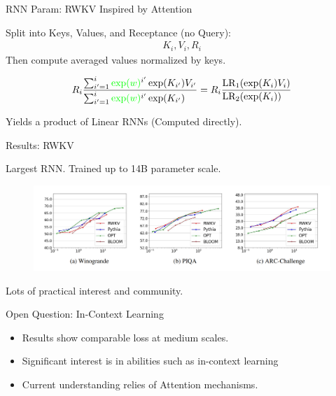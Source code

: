 \begin{frame}{RNN Param: RWKV \cite{Peng2023-yp}}
    Inspired by Attention 
    
    Split into Keys, Values, and Receptance (no Query):
    \begin{align*}
    K_i, V_i, R_i
    \end{align*}
    \pause 
    Then compute averaged values normalized by keys. 
    
    \begin{align*}
     R_i\frac{\sum_{i'=1}^i \textcolor{green}{\exp(w)}^{i'}\exp(K_{i'}) V_{i'}} {\sum_{i'=1}^i \textcolor{green}{\exp(w)}^{i'}\exp(K_{i'})\phantom{ V_{i'}}} = R_i \frac{\text{LR}_1(\exp(K_i)V_i)}{\text{LR}_2(\exp(K_i))\phantom{V_i}}\\
    \end{align*}

    Yields a product of Linear RNNs (Computed directly).
    
\end{frame}


\begin{frame}{Results: RWKV \cite{Peng2023-yp}}
    \begin{center}
        Largest RNN. Trained up to 14B parameter scale.
    \end{center}
    \pause 
    \begin{figure}
        \centering
        \includegraphics[width=1\textwidth]{Figs/RWKV.png}
        \label{fig:my_label}
    \end{figure}
    Lots of practical interest and community.
\end{frame}


\begin{frame}{Open Question: In-Context Learning}
    \begin{itemize}
        \item Results show comparable loss at medium scales.
        \item Significant interest is in abilities such as in-context learning
        \item Current understanding relies of Attention mechanisms.
    \end{itemize}
\end{frame}


